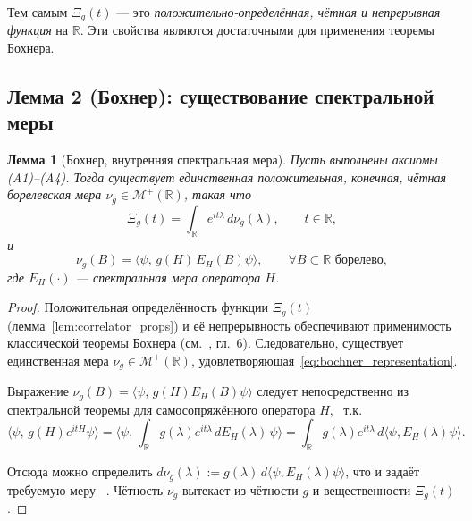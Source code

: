 \documentclass{article}
\numberwithin{equation}{section}
\theoremstyle{plain}
\newtheorem{lemma}{Лемма}
\theoremstyle{definition}
\theoremstyle{remark}
\def\cdot{·}\def\times{×}\def\pm{±}\def\mp{∓}\def\approx{≈}%
\begin{document}
\noindent
Тем самым $\Xi_g(t)$ — это \emph{положительно-определённая, чётная и непрерывная функция} на $\mathbb R$.  
Эти свойства являются достаточными для применения теоремы Бохнера.

\subsection{Лемма 2 (Бохнер): существование спектральной меры}
\label{subsec:bochner}

\begin{lemma}[Бохнер, внутренняя спектральная мера]
\label{lem:bochner}
Пусть выполнены аксиомы (A1)–(A4).  
Тогда существует единственная положительная, конечная, чётная борелевская мера $\nu_g\in\mathcal M^+(\mathbb R)$, такая что
\begin{equation}
\label{eq:bochner_representation}
\Xi_g(t)
=\int_{\mathbb R} e^{it\lambda}\,d\nu_g(\lambda),
\qquad t\in\mathbb R,
\end{equation}
и
\begin{equation}
\nu_g(B)
=\langle\psi,\,g(H)\,E_H(B)\psi\rangle,
\qquad 
\forall B\subset\mathbb R \text{ борелево},
\end{equation}
где $E_H(\cdot)$ — спектральная мера оператора $H$.
\end{lemma}

\begin{proof}
Положительная определённость функции $\Xi_g(t)$ (лемма~\ref{lem:correlator_props}) и её непрерывность обеспечивают применимость классической теоремы Бохнера (см.~\cite{RudinFA}, гл.~6).  
Следовательно, существует единственная мера $\nu_g\in\mathcal M^+(\mathbb R)$, удовлетворяющая~\eqref{eq:bochner_representation}.  

Выражение $\nu_g(B)=\langle\psi,\,g(H)E_H(B)\psi\rangle$ следует непосредственно из спектральной теоремы для самосопряжённого оператора $H$, ~\cite{DunfordSchwartzII}т.к.
\begin{equation}
\langle\psi,\,g(H)e^{itH}\psi\rangle
=\langle\psi,\,\int_{\mathbb R} g(\lambda)e^{it\lambda}\,dE_H(\lambda)\,\psi\rangle
=\int_{\mathbb R} g(\lambda)e^{it\lambda}\,d\langle\psi,E_H(\lambda)\psi\rangle.
\label{eq:QSSC0014}
\end{equation}

Отсюда можно определить $d\nu_g(\lambda):=g(\lambda)\,d\langle\psi,E_H(\lambda)\psi\rangle$, что и задаёт требуемую меру ~\cite{Titchmarsh1948}.  
Чётность $\nu_g$ вытекает из чётности $g$ и вещественности $\Xi_g(t)$.
\end{proof}
\end{document}
